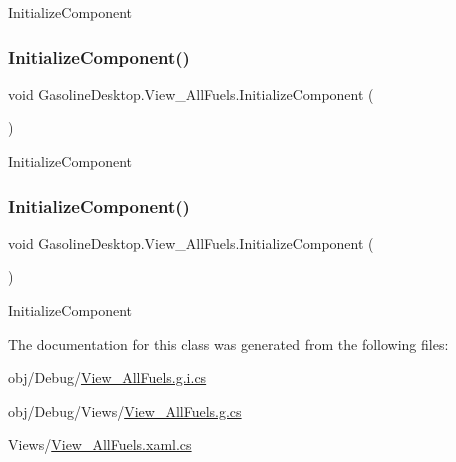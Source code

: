 Initialize\+Component 

\mbox{\label{class_gasoline_desktop_1_1_view___all_fuels_a5b5ef4ae6f2ee05ce8ec6b8af1ba331f}} 
\subsubsection{\texorpdfstring{InitializeComponent()}{InitializeComponent()}\hspace{0.1cm}{\footnotesize\ttfamily [2/3]}}
{\footnotesize\ttfamily void Gasoline\+Desktop.\+View\+\_\+\+All\+Fuels.\+Initialize\+Component (\begin{DoxyParamCaption}{ }\end{DoxyParamCaption})}



Initialize\+Component 

\mbox{\label{class_gasoline_desktop_1_1_view___all_fuels_a5b5ef4ae6f2ee05ce8ec6b8af1ba331f}} 
\subsubsection{\texorpdfstring{InitializeComponent()}{InitializeComponent()}\hspace{0.1cm}{\footnotesize\ttfamily [3/3]}}
{\footnotesize\ttfamily void Gasoline\+Desktop.\+View\+\_\+\+All\+Fuels.\+Initialize\+Component (\begin{DoxyParamCaption}{ }\end{DoxyParamCaption})}



Initialize\+Component 



The documentation for this class was generated from the following files\+:\begin{DoxyCompactItemize}
\item 
obj/\+Debug/\mbox{\hyperlink{_view___all_fuels_8g_8i_8cs}{View\+\_\+\+All\+Fuels.\+g.\+i.\+cs}}\item 
obj/\+Debug/\+Views/\mbox{\hyperlink{_view___all_fuels_8g_8cs}{View\+\_\+\+All\+Fuels.\+g.\+cs}}\item 
Views/\mbox{\hyperlink{_view___all_fuels_8xaml_8cs}{View\+\_\+\+All\+Fuels.\+xaml.\+cs}}\end{DoxyCompactItemize}
